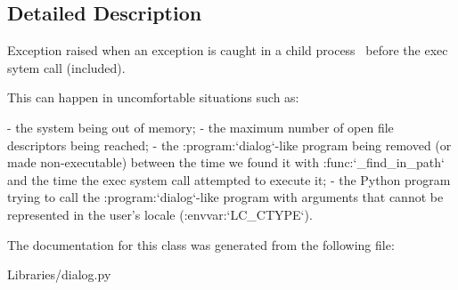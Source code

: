 \subsection{Detailed Description}
\begin{DoxyVerb}Exception raised when an exception is caught in a child process \
before the exec sytem call (included).

This can happen in uncomfortable situations such as:

  - the system being out of memory;
  - the maximum number of open file descriptors being reached;
  - the :program:`dialog`-like program being removed (or made
    non-executable) between the time we found it with
    :func:`_find_in_path` and the time the exec system call
    attempted to execute it;
  - the Python program trying to call the :program:`dialog`-like
    program with arguments that cannot be represented in the user's
    locale (:envvar:`LC_CTYPE`).\end{DoxyVerb}
 

The documentation for this class was generated from the following file\+:\begin{DoxyCompactItemize}
\item 
Libraries/dialog.\+py\end{DoxyCompactItemize}
